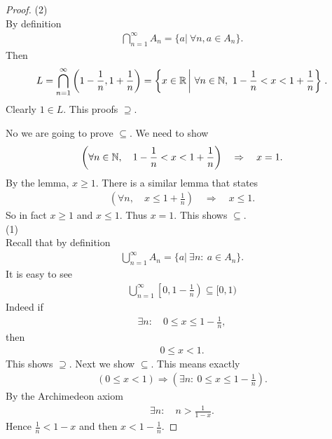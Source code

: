 \begin{proof}
(2)  \\
By definition 
\begin{align*}
\bigcap_{n=1}^\infty A_n = \{ a| ~\forall n,  a \in A_n \}.
\end{align*}
Then
\begin{align*}
L= \bigcap_{n=1}^\infty  \left( 1- \frac 1 n, 1+ \frac 1 n\right) = \left\{ x \in \mathbb R \left|~ \forall n \in \mathbb N, ~ 1 -\frac 1 n < x < 1 + \frac 1 n \right\} \right. .
\end{align*}
Clearly $1 \in L$. This proofs $\supseteq$.

No we are going to prove $\subseteq$. We need to show
\begin{align*}
\left(\forall n \in \mathbb N, \quad 1- \frac 1 n < x < 1 +\frac 1 n \right) \quad \Rightarrow \quad x=1.
\end{align*}
By the lemma, $x \geq 1$. There is a similar lemma that states
\begin{align*}
\left( \forall n, \quad x \leq 1 + \frac 1 n \right) \quad \Rightarrow \quad x \leq 1 .
\end{align*}
So in fact $x \geq 1$ and $x \leq 1$. Thus $x=1$. This shows $\subseteq$.\\
(1) \\
Recall that by definition
\begin{align*}
\bigcup_{n=1}^\infty A_n = \{a| ~ \exists n : ~ a \in A_n \} .
\end{align*}
It is easy to see
\begin{align*}
\bigcup_{n=1}^\infty \left[ 0, 1 - \frac 1 n \right) \subseteq [0,1) 
\end{align*}
Indeed if
\begin{align*}
\exists n : \quad 0 \leq x \leq 1 -\frac 1 n,
\end{align*}
then
\begin{align*}
0 \leq x < 1.
\end{align*}
This shows $\supseteq$. Next we show $\subseteq$. This means exactly
\begin{align*}
(0 \leq x < 1) \Rightarrow \left( \exists n: ~ 0 \leq x \leq 1 - \frac 1 n \right).
\end{align*}
By the Archimedeon axiom 
\begin{align*}
\exists n: \quad n > \frac 1 {1-x}.
\end{align*}
Hence $\frac 1 n < 1-x$ and then $x< 1-\frac 1 n$.
\end{proof}



